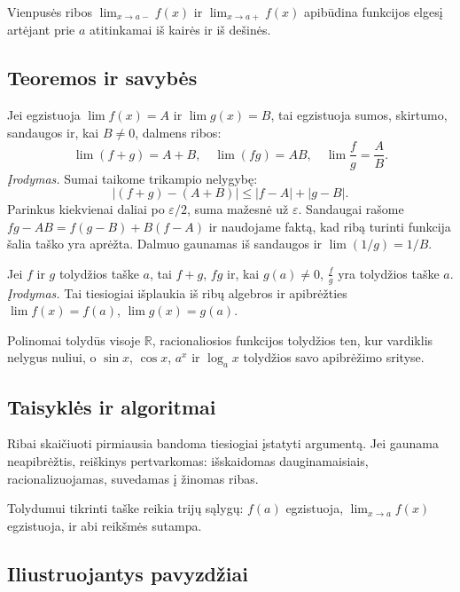\begin{apibreztis}
Vienpusės ribos $\lim_{x\to a-}f(x)$ ir $\lim_{x\to a+}f(x)$ apibūdina funkcijos elgesį artėjant prie $a$ atitinkamai iš kairės ir iš dešinės.
\end{apibreztis}

\subsection{Teoremos ir savybės}

\begin{teorema}
Jei egzistuoja $\lim f(x)=A$ ir $\lim g(x)=B$, tai egzistuoja sumos, skirtumo, sandaugos ir, kai $B\ne0$, dalmens ribos:
\[
\lim(f+g)=A+B,\quad \lim(fg)=AB,\quad \lim\frac{f}{g}=\frac{A}{B}.
\]
\emph{Įrodymas.} Sumai taikome trikampio nelygybę:
\[
|(f+g)-(A+B)|\le |f-A|+|g-B|.
\]
Parinkus kiekvienai daliai po $\varepsilon/2$, suma mažesnė už $\varepsilon$. Sandaugai rašome $fg-AB=f(g-B)+B(f-A)$ ir naudojame faktą, kad ribą turinti funkcija šalia taško yra aprėžta. Dalmuo gaunamas iš sandaugos ir $\lim(1/g)=1/B$.
\end{teorema}

\begin{teorema}
Jei $f$ ir $g$ tolydžios taške $a$, tai $f+g$, $fg$ ir, kai $g(a)\ne0$, $\frac{f}{g}$ yra tolydžios taške $a$.
\emph{Įrodymas.} Tai tiesiogiai išplaukia iš ribų algebros ir apibrėžties $\lim f(x)=f(a)$, $\lim g(x)=g(a)$.
\end{teorema}

\begin{savybe}
Polinomai tolydūs visoje $\mathbb{R}$, racionaliosios funkcijos tolydžios ten, kur vardiklis nelygus nuliui, o $\sin x$, $\cos x$, $a^x$ ir $\log_a x$ tolydžios savo apibrėžimo srityse.
\end{savybe}

\subsection{Taisyklės ir algoritmai}

Ribai skaičiuoti pirmiausia bandoma tiesiogiai įstatyti argumentą. Jei gaunama neapibrėžtis, reiškinys pertvarkomas: išskaidomas dauginamaisiais, racionalizuojamas, suvedamas į žinomas ribas.

Tolydumui tikrinti taške reikia trijų sąlygų: $f(a)$ egzistuoja, $\lim_{x\to a}f(x)$ egzistuoja, ir abi reikšmės sutampa.

\subsection{Iliustruojantys pavyzdžiai}


